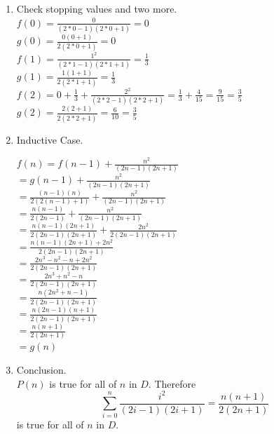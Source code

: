 \documentclass{article}
\begin{document}
\begin{enumerate}
\begin{enumerate}[1.]
        \item Check stopping values and two more.\\
        $f(0) = \frac{0}{(2*0-1)(2*0+1)} = 0$\\
        $g(0) = \frac{0(0+1)}{2(2*0+1)} = 0$\\
        $f(1) = \frac{1^{2}}{(2*1-1)(2*1+1)} = \frac{1}{3}$\\
        $g(1) = \frac{1(1+1)}{2(2*1+1)} = \frac{1}{3}$\\
        $f(2) = 0 + \frac{1}{3} + \frac{2^{2}}{(2*2-1)(2*2+1)} = \frac{1}{3} + \frac{4}{15} = \frac{9}{15} = \frac{3}{5}$\\
        $g(2) = \frac{2(2+1)}{2(2*2+1)} = \frac{6}{10} = \frac{3}{5}$
        \item Inductive Case.
        \begin{multicols}{2}
            $f(n)=f(n-1)+\frac{n^{2}}{(2n-1)(2n+1)}$\\
            $=g(n-1)+\frac{n^{2}}{(2n-1)(2n+1)}$\\
            $=\frac{(n-1)(n)}{2(2(n-1)+1)}+\frac{n^{2}}{(2n-1)(2n+1)}$\\
            $=\frac{n(n-1)}{2(2n-1)}+\frac{n^{2}}{(2n-1)(2n+1)}$\\
            $=\frac{n(n-1)(2n+1)}{2(2n-1)(2n+1)}+\frac{2n^{2}}{2(2n-1)(2n+1)}$\\
            $=\frac{n(n-1)(2n+1)+2n^{2}}{2(2n-1)(2n+1)}$\\
            $=\frac{2n^{3}-n^{2}-n+2n^{2}}{2(2n-1)(2n+1)}$\\
            $=\frac{2n^{3}+n^{2}-n}{2(2n-1)(2n+1)}$\\
            $=\frac{n(2n^{2}+n-1)}{2(2n-1)(2n+1)}$\\
            $=\frac{n(2n-1)(n+1)}{2(2n-1)(2n+1)}$\\
            $=\frac{n(n+1)}{2(2n+1)}$\\
            $=g(n)$
        \end{multicols}
        \item Conclusion.\\
        $P(n)$ is true for all of $n$ in $D$. Therefore 
        $$\sum\limits_{i=0}^{n} \frac{i^{2}}{(2i-1)(2i+1)} = \frac{n(n+1)}{2(2n+1)}$$ 
        is true for all of $n$ in $D$.
    \end{enumerate}
\end{enumerate}
\end{document}

